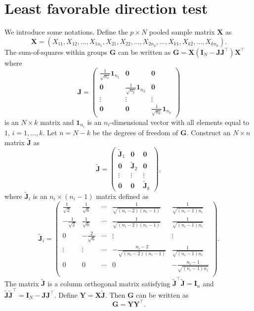 \documentclass[12pt]{article} %
\newcommand{\bX}{\mathbf{X}}
\newcommand{\bY}{\mathbf{Y}}
\newcommand{\bG}{\mathbf{G}}
\newcommand{\bJ}{\mathbf{J}}
\newcommand{\bI}{\mathbf{I}}
\theoremstyle{definition}
\begin{document}
\section{Least favorable direction test}\label{methodology}
We introduce some notations.
 Define the $p\times N$ pooled sample matrix $\bX$ as
 $$\bX=(X_{11},X_{12},\ldots,X_{1n_1},X_{21},X_{22},\ldots,X_{2n_2},\ldots,X_{k1},X_{k2},\ldots,X_{kn_k}).$$
 The sum-of-squares within groups $\bG$ can be written as $\bG=\bX(\bI_N-\bJ\bJ^\top)\bX^\top$ where
 $$
 \bJ=\begin{pmatrix}
     \frac{1}{\sqrt{n_1}}\mathbf{1}_{n_1}&\mathbf{0} & \mathbf{0}\\
     \mathbf{0}&\frac{1}{\sqrt{n_2}} \mathbf{1}_{n_2}& \mathbf{0}\\
     \vdots &\vdots &\vdots \\
     \mathbf{0}&\mathbf{0}&\frac{1}{\sqrt{n_k}}\mathbf{1}_{n_k}
 \end{pmatrix}
 $$
 is an $N\times k$ matrix
 and $\mathbf{1}_{n_i}$ is an $n_i$-dimensional vector with all elements equal to $1$, $i=1,\ldots, k$.
 Let $n=N-k$ be the degrees of freedom of $\bG$.
 Construct an $N\times n$ matrix $\tilde{\bJ}$ as 
 $$
 \tilde{\bJ}=\begin{pmatrix}
     \tilde{\bJ}_1&\mathbf{0} & \mathbf{0}\\
     \mathbf{0}&\tilde{\bJ}_2& \mathbf{0}\\
     \vdots &\vdots &\vdots \\
     \mathbf{0}&\mathbf{0}&\tilde{\bJ}_k
 \end{pmatrix},
 $$
 where $\tilde{\bJ}_i$ is an $n_i\times (n_{i}-1)$ matrix defined as
 $$
\tilde{\bJ}_i=\begin{pmatrix}
    \frac{1}{\sqrt{2}}&\frac{1}{\sqrt{6}}&\cdots&\frac{1}{\sqrt{(n_i-2)(n_i-1)}}&\frac{1}{\sqrt{(n_i-1)n_i}}\\
    -\frac{1}{\sqrt{2}}&\frac{1}{\sqrt{6}}&\cdots&\frac{1}{\sqrt{(n_i-2)(n_i-1)}}&\frac{1}{\sqrt{(n_i-1)n_i}}\\
    0&-\frac{2}{\sqrt{6}}&\cdots&\vdots&\vdots\\
    \vdots&\vdots&\cdots&-\frac{n_i-2}{\sqrt{(n_i-2)(n_i-1)}}&\frac{1}{\sqrt{(n_i-1)n_i}}\\
    0&0&\cdots&0&-\frac{n_i-1}{\sqrt{(n_i-1)n_i}}\\
\end{pmatrix}.
 $$
The matrix $\tilde{\bJ}$ is a column orthogonal matrix  satisfying $\tilde{\bJ}^\top\tilde{\bJ}=\bI_{n}$ and $\tilde{\bJ}\tilde{\bJ}^\top =\bI_N-\bJ\bJ^\top$.
Define $\bY=\bX\tilde{\bJ}$.
Then $\bG$ can be written as
$$\bG=
\bY \bY^\top.
$$
\end{document}
